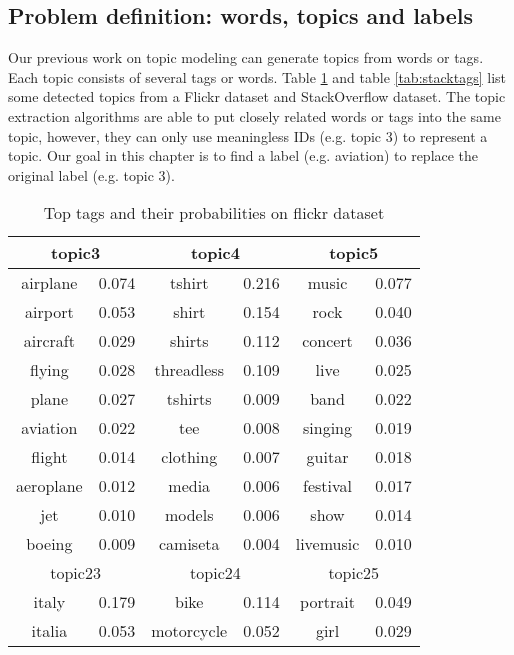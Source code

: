 \subsection{Problem definition: words, topics and labels}
Our previous work on topic modeling can generate topics from words or tags. Each topic consists of several tags or words. Table \ref{tab:flickrtags} and table \ref{tab:stacktags} list some detected topics from a Flickr dataset and StackOverflow dataset. The topic extraction algorithms are able to put closely related words or tags into the same topic, however, they can only use meaningless IDs (e.g. topic 3) to represent a topic. Our goal in this chapter is to find a label (e.g. aviation) to replace the original label (e.g. topic 3).



\begin{table}[htp]
\caption{Top tags and their probabilities on flickr dataset}
\label{tab:flickrtags}
\centering
\begin{tabular}{|c|c|c|c|c|c|}
\hline
\multicolumn{2}{|c|}{topic3} & \multicolumn{2}{c|}{topic4} & \multicolumn{2}{c|}{topic5}  \\
\hline
airplane&0.074&tshirt&0.216&music&0.077\\ \hline
airport&0.053&shirt&0.154&rock&0.040\\ \hline
aircraft&0.029&shirts&0.112&concert&0.036\\ \hline
flying&0.028&threadless&0.109&live&0.025\\ \hline
plane&0.027&tshirts&0.009&band&0.022\\ \hline
aviation&0.022&tee&0.008&singing&0.019\\ \hline
flight&0.014&clothing&0.007&guitar&0.018\\ \hline
aeroplane&0.012&media&0.006&festival&0.017\\ \hline
jet&0.010&models&0.006&show&0.014\\ \hline
boeing&0.009&camiseta&0.004&livemusic&0.010\\ \hline
\hline
\multicolumn{2}{|c|}{topic23} & \multicolumn{2}{c|}{topic24} & \multicolumn{2}{c|}{topic25}  \\
\hline
italy&0.179&bike&0.114&portrait&0.049\\ \hline
italia&0.053&motorcycle&0.052&girl&0.029\\ \hline

\end{tabular}
\end{table}
